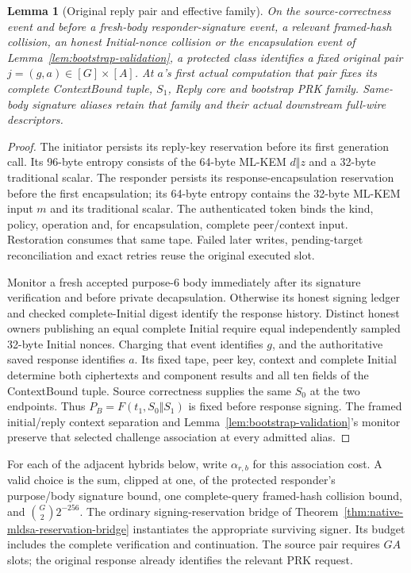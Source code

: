 \documentclass[pdflatex]{sn-jnl}
\theoremstyle{thmstyleone}
\newtheorem{lemma}[theorem]{Lemma}
\theoremstyle{thmstylethree}
\theoremstyle{thmstyletwo}
\begin{document}
\begin{lemma}[Original reply pair and effective family]
\label{lem:bootstrap-reply-origin}
On the source-correctness event and before a fresh-body responder-signature
event, a relevant framed-hash collision, an honest Initial-nonce collision
or the encapsulation event
of Lemma~\ref{lem:bootstrap-validation}, a protected class identifies a
fixed original pair $j=(g,a)\in[G]\times[A]$. At $a$'s first actual
computation that pair fixes its complete ContextBound tuple, $S_1$,
Reply core and bootstrap PRK family. Same-body signature aliases retain
that family and their actual downstream full-wire descriptors.
\end{lemma}
\begin{proof}
The initiator persists its reply-key reservation before its first
generation call. Its 96-byte entropy consists of the 64-byte ML-KEM
$d\Vert z$ and a 32-byte traditional scalar. The responder persists
its response-encapsulation reservation before the first encapsulation;
its 64-byte entropy contains the 32-byte ML-KEM input $m$ and its
traditional scalar. The authenticated token binds the kind, policy,
operation and, for encapsulation, complete peer/context input.
Restoration consumes that same tape. Failed later writes, pending-target
reconciliation and exact retries reuse the original executed slot.

Monitor a fresh accepted purpose-6 body immediately after its signature
verification and before private decapsulation. Otherwise its honest
signing ledger and checked complete-Initial digest identify the response
history. Distinct honest owners publishing an equal complete Initial
require equal independently sampled 32-byte Initial nonces. Charging
that event identifies $g$, and the authoritative saved response
identifies $a$. Its fixed tape, peer key, context and complete Initial
determine both ciphertexts and component results and all ten fields of
the ContextBound tuple. Source correctness supplies the same $S_0$ at
the two endpoints. Thus $P_B=F(t_1,S_0\Vert S_1)$ is fixed before
response signing. The framed initial/reply context separation and
Lemma~\ref{lem:bootstrap-validation}'s monitor preserve that selected
challenge association at every admitted alias.
\end{proof}

For each of the adjacent hybrids below, write $\alpha_{r,b}$ for this
association cost. A valid choice is the sum, clipped at one, of the
protected responder's purpose/body signature bound, one complete-query
framed-hash collision bound, and $\binom G2 2^{-256}$. The ordinary
signing-reservation bridge of
Theorem~\ref{thm:native-mldsa-reservation-bridge} instantiates the
appropriate surviving signer. Its budget includes the complete
verification and continuation. The source pair requires $GA$ slots;
the original response already identifies the relevant PRK request.
\end{document}
